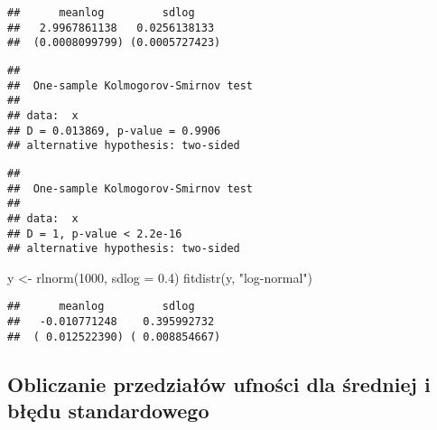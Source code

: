 \documentclass[
]{book}
\newenvironment{Shaded}{\begin{snugshade}}{\end{snugshade}}
\newcommand{\AttributeTok}[1]{\textcolor[rgb]{0.77,0.63,0.00}{#1}}
\newcommand{\CommentTok}[1]{\textcolor[rgb]{0.56,0.35,0.01}{\textit{#1}}}
\newcommand{\DecValTok}[1]{\textcolor[rgb]{0.00,0.00,0.81}{#1}}
\newcommand{\FloatTok}[1]{\textcolor[rgb]{0.00,0.00,0.81}{#1}}
\newcommand{\FunctionTok}[1]{\textcolor[rgb]{0.00,0.00,0.00}{#1}}
\newcommand{\NormalTok}[1]{#1}
\newcommand{\OtherTok}[1]{\textcolor[rgb]{0.56,0.35,0.01}{#1}}
\newcommand{\SpecialCharTok}[1]{\textcolor[rgb]{0.00,0.00,0.00}{#1}}
\newcommand{\StringTok}[1]{\textcolor[rgb]{0.31,0.60,0.02}{#1}}
\begin{document}
\begin{verbatim}
##      meanlog         sdlog    
##   2.9967861138   0.0256138133 
##  (0.0008099799) (0.0005727423)
\end{verbatim}

\begin{Shaded}
\end{Shaded}

\begin{verbatim}
## 
##  One-sample Kolmogorov-Smirnov test
## 
## data:  x
## D = 0.013869, p-value = 0.9906
## alternative hypothesis: two-sided
\end{verbatim}

\begin{Shaded}
\end{Shaded}

\begin{verbatim}
## 
##  One-sample Kolmogorov-Smirnov test
## 
## data:  x
## D = 1, p-value < 2.2e-16
## alternative hypothesis: two-sided
\end{verbatim}

\begin{Shaded}
\begin{Highlighting}[]
\NormalTok{y }\OtherTok{\textless{}{-}} \FunctionTok{rlnorm}\NormalTok{(}\DecValTok{1000}\NormalTok{, }\AttributeTok{sdlog =} \FloatTok{0.4}\NormalTok{)}
\FunctionTok{fitdistr}\NormalTok{(y, }\StringTok{"log{-}normal"}\NormalTok{)}
\end{Highlighting}
\end{Shaded}

\begin{verbatim}
##      meanlog         sdlog    
##   -0.010771248    0.395992732 
##  ( 0.012522390) ( 0.008854667)
\end{verbatim}

\hypertarget{obliczanie-przedziaux142uxf3w-ufnoux15bci-dla-ux15bredniej-i-bux142ux119du-standardowego}{%
\subsection{Obliczanie przedziałów ufności dla średniej i błędu standardowego}\label{obliczanie-przedziaux142uxf3w-ufnoux15bci-dla-ux15bredniej-i-bux142ux119du-standardowego}}
\end{document}
